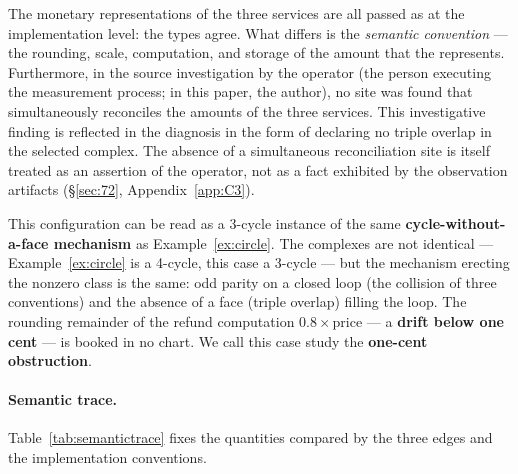 The monetary representations of the three services are all passed as
 at the implementation level: the types agree. What
differs is the \emph{semantic convention} --- the rounding, scale,
computation, and storage of the amount that the 
represents. Furthermore, in the source investigation by the operator
(the person executing the measurement process; in this paper, the
author), no site was found that simultaneously reconciles the amounts
of the three services. This investigative finding is reflected in the
diagnosis in the form of declaring no triple overlap in the selected
complex. The absence of a simultaneous reconciliation site is itself
treated as an assertion of the operator, not as a fact exhibited by the
observation artifacts (\S\ref{sec:72}, Appendix~\ref{app:C3}).

This configuration can be read as a 3-cycle instance of the same
\textbf{cycle-without-a-face mechanism} as Example~\ref{ex:circle}.
The complexes are not identical --- Example~\ref{ex:circle} is a
4-cycle, this case a 3-cycle --- but the mechanism erecting the
nonzero class is the same: odd parity on a closed loop (the collision
of three conventions) and the absence of a face (triple overlap) filling
the loop. The rounding remainder of the refund computation
$0.8\times\text{price}$ --- a \textbf{drift below one cent} --- is
booked in no chart. We call this case study the \textbf{one-cent
obstruction}.

\paragraph{Semantic trace.}
Table~\ref{tab:semantictrace} fixes the quantities compared by the
three edges and the implementation conventions.

